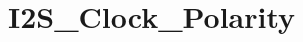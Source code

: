 \hypertarget{group___i2_s___clock___polarity}{\section{I2\-S\-\_\-\-Clock\-\_\-\-Polarity}
\label{group___i2_s___clock___polarity}
}
